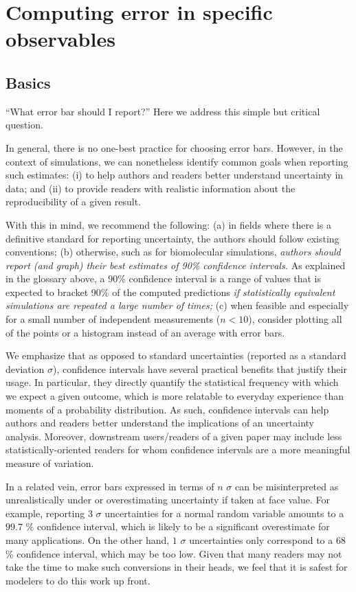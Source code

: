 \section{Computing error in specific observables}
\label{sec:specific}

\subsection{Basics}
``What error bar should I report?''
Here we address this simple but critical question.

In general, there is no one-best practice for choosing error bars. However, in the context of simulations, we can nonetheless identify common goals when reporting such estimates: (i) to help authors and readers better understand uncertainty in data; and (ii) to provide readers with realistic information about the reproducibility of a given result.

With this in mind, we recommend the following: (a) in fields where there is a definitive standard for reporting uncertainty, the authors should follow existing conventions; (b) otherwise, such as for biomolecular simulations, \emph{authors should report (and graph) their best estimates of 90\% confidence intervals.} As explained in the glossary above, a 90\% confidence interval is a range of values that is expected to bracket 90\% of the computed predictions \emph{if statistically equivalent simulations are repeated a large number of times;} (c) when feasible and especially for a small number of independent measurements ($n < 10$), consider plotting all of the points or a histogram instead of an average with error bars.


We emphasize that as opposed to standard uncertainties (reported as a standard deviation $\sigma$), confidence intervals have several practical benefits that justify their usage. In particular, they directly quantify the statistical frequency with which we expect a given outcome, which is more relatable to everyday experience than moments of a probability distribution. As such, confidence intervals can help authors and readers better understand the implications of an uncertainty analysis. Moreover, downstream users/readers of a given paper may include less statistically-oriented readers for whom confidence intervals are a more meaningful measure of variation.

In a related vein, error bars expressed in terms of $n$ $\sigma$ can be misinterpreted as unrealistically under or overestimating uncertainty if taken at face value. For example, reporting $3$ $\sigma$ uncertainties for a normal random variable amounts to a $99.7$ \% confidence interval, which is likely to be a significant overestimate for many applications. On the other hand, $1$ $\sigma$ uncertainties only correspond to a $68$ \% confidence interval, which may be too low. Given that many readers may not take the time to make such conversions in their heads, we feel that it is safest for modelers to do this work up front.

